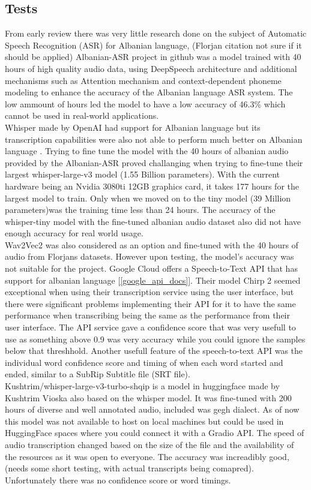 \documentclass[12pt]{article}
\begin{document}
\subsection{Tests}
From early review there was very little research done on the subject of Automatic Speech Recognition (ASR) for Albanian language, (Florjan citation not sure if it should be applied) Albanian-ASR project in github was a model trained with 40 hours of high quality audio data, using DeepSpeech architecture and additional mechanisms such as Attention mechanism and context-dependent phoneme modeling to enhance the accuracy of the Albanian language ASR system. The low ammount of hours led the model to have a low accuracy of 46.3\% which cannot be used in real-world applications.\\
Whisper made by OpenAI had support for Albanian language but its transcription capabilities were also not able to perform much better on Albanian language \cite{openai_whisper}. Trying to fine tune the model with the 40 hours of albanian audio provided by the Albanian-ASR proved challanging when trying to fine-tune their largest whisper-large-v3 model (1.55 Billion parameters). With the current hardware being an Nvidia 3080ti 12GB graphics card, it takes 177 hours for the largest model to train. Only when we moved on to the tiny model (39 Million parameters)was the training time less than 24 hours. The accuracy of the whisper-tiny model with the fine-tuned albanian audio dataset also did not have enough accuracy for real world usage.\\
Wav2Vec2 was also considered as an option and fine-tuned with the 40 hours of audio from Florjans datasets. However upon testing, the model's accuracy was not suitable for the project. 
Google Cloud offers a Speech-to-Text API that has support for albanian language [\ref{google_api_docs}]. Their model Chirp 2 seemed exceptional when using their transcription service using the user interface, but there were significant problems implementing their API for it to have the same performance when transcribing being the same as the performance from their user interface. The API service gave a confidence score that was very usefull to use as something above 0.9 was very accuracy while you could ignore the samples below that threshhold. Another usefull feature of the speech-to-text API was the individual word confidence score and timing of when each word started and ended, similar to a SubRip Subtitle file (SRT file).\\
Kushtrim/whisper-large-v3-turbo-shqip is a model in huggingface made by Kushtrim Vioska also based on the whisper model. It was fine-tuned with 200 hours of diverse and well annotated audio, included was gegh dialect. As of now this model was not available to host on local machines but could be used in HuggingFace spaces where you could connect it with a  Gradio API. The speed of audio transcription changed based on the size of the file and the availability of the resources as it was open to everyone. The accuracy was increadibly good, (needs some short testing, with actual transcripts being comapred). Unfortunately there was no confidence score or word timings.\\
\end{document}
